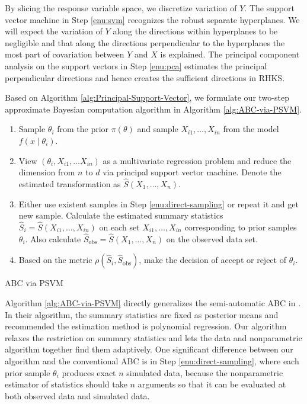 By slicing the response variable space, we discretize variation of
$Y$. The support vector machine in Step \ref{enu:svm} recognizes
the robust separate hyperplanes. We will expect the variation of $Y$
along the directions within hyperplanes to be negligible and that
along the directions perpendicular to the hyperplanes the most part
of covariation between $Y$ and $X$ is explained. The principal component
analysis on the support vectors in Step \ref{enu:pca} estimates the {{}
} {principal } {{} }perpendicular directions
and hence creates the sufficient directions in RHKS. 

Based on Algorithm \ref{alg:Principal-Support-Vector}, we formulate
our  {two-step }approximate Bayesian computation algorithm
in Algorithm \ref{alg:ABC-via-PSVM}.

\begin{algorithm}
\begin{enumerate}
\item \label{enu:direct-sampling}Sample $\theta_{i}$ from the prior $\pi\left(\theta\right)$
and sample $X_{i1},\ldots,X_{in}$ from the model $f\left(x\mid\theta_{i}\right)$. 
\item View $\left(\theta_{i},X_{i1},\ldots X_{in}\right)$ as a multivariate
regression problem and reduce the dimension from $n$ to $d$ via
principal support vector machine. Denote the estimated transformation
as $\hat{S}\left(X_{1},\ldots,X_{n}\right)$. 
\item Either use existent samples in Step \ref{enu:direct-sampling} or
repeat it and get new sample. Calculate the estimated summary statistics
$\hat{S}_{i}=\hat{S}\left(X_{i1},\ldots,X_{in}\right)$ on each set
$X_{i1},\ldots,X_{in}$ corresponding to prior samples $\theta_{i}$.
Also calculate $\hat{S}_{\mathrm{obs}}=\hat{S}\left(X_{1},\ldots,X_{n}\right)$
on the observed data set.
\item Based on the metric $\rho\left(\hat{S}_{i},\hat{S}_{\mathrm{obs}}\right)$,
make the decision of accept or reject of $\theta_{i}$. 
\end{enumerate}
\protect\caption{\label{alg:ABC-via-PSVM}ABC via PSVM}
\end{algorithm}
Algorithm \ref{alg:ABC-via-PSVM} directly generalizes the semi-automatic
ABC in \citet{fearnhead2012constructing}. In their algorithm, the
summary statistics are fixed as posterior means and recommended the
estimation method is polynomial regression. Our algorithm relaxes
the restriction on summary statistics and{} lets
the data and nonparametric algorithm together find them adaptively.
One significant difference between our algorithm and the conventional
ABC is in Step \ref{enu:direct-sampling}, where each prior sample
$\theta_{i}$ produces exact $n$ simulated data, because the nonparametric
estimator of statistics should take $n$ arguments so that it can
be evaluated at both observed data and simulated data.

